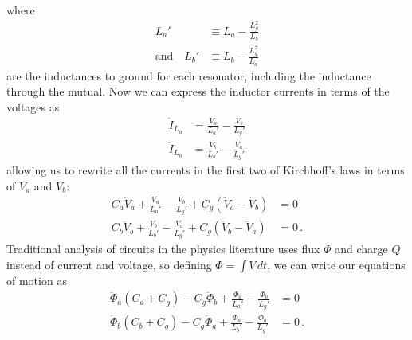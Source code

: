 where
\begin{align*}
  L_a' & \equiv L_a - \frac{L_g^2}{L_b} \\
  \text{and} \quad
  L_b' & \equiv L_b - \frac{L_g^2}{L_a}
\end{align*}
are the inductances to ground for each resonator, including the inductance through the mutual.
Now we can express the inductor currents in terms of the voltages as
\begin{align*}
  \dot I_{L_a} &= \frac{V_a}{L_a'} - \frac{V_b}{L_g'} \\
  \dot I_{L_b} &= \frac{V_b}{L_b'} - \frac{V_a}{L_g'}
\end{align*}
allowing us to rewrite all the currents in the first two of Kirchhoff's laws in terms of $V_a$ and $V_b$:
\begin{align*}
  C_a \ddot V_a + \frac{V_a}{L_a'} - \frac{V_b}{L_g'} + C_g (\ddot V_a - \ddot V_b) &= 0 \\
  C_b \ddot V_b + \frac{V_b}{L_b'} - \frac{V_a}{L_g'} + C_g (\ddot V_b - \ddot V_a) &= 0 \, .
\end{align*}
Traditional analysis of circuits in the physics literature uses flux $\Phi$ and charge $Q$ instead of current and voltage, so defining $\Phi = \int V \, dt$, we can write our equations of motion as
\begin{align}
  \ddot \Phi_a (C_a + C_g) - C_g \ddot \Phi_b + \frac{\Phi_a}{L_a'} - \frac{\Phi_b}{L_g'} &= 0 \nonumber \\
  \ddot \Phi_b (C_b + C_g) - C_g \ddot \Phi_a + \frac{\Phi_b}{L_b'} - \frac{\Phi_a}{L_g'} &= 0
  \label{eq:coupled_equations_of_motion}
  \, .
\end{align}


